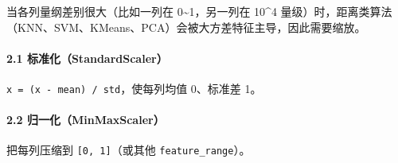 当各列量纲差别很大（比如一列在 0\textasciitilde1，另一列在 10\^{}4
量级）时，距离类算法（KNN、SVM、KMeans、PCA）会被大方差特征主导，因此需要缩放。

\paragraph{2.1
标准化（StandardScaler）}\label{ux6807ux51c6ux5316standardscaler}

\texttt{x\textquotesingle{}\ =\ (x\ -\ mean)\ /\ std}，使每列均值
0、标准差 1。

\begin{Shaded}
\begin{Highlighting}[]

\OperatorTok{=}\NormalTok{ np.array([[}\NormalTok{, }\NormalTok{], [}\NormalTok{, }\NormalTok{], [}\NormalTok{, }\NormalTok{]])}
\OperatorTok{=}
\NormalTok{(}\NormalTok{))}
\end{Highlighting}
\end{Shaded}

\begin{Shaded}
\begin{Highlighting}[]
\NormalTok{[[{-}1.2247 {-}1.2247]}
\NormalTok{ [ 0.      0.    ]}
\NormalTok{ [ 1.2247  1.2247]]}
\end{Highlighting}
\end{Shaded}

\paragraph{2.2
归一化（MinMaxScaler）}\label{ux5f52ux4e00ux5316minmaxscaler}

把每列压缩到 \texttt{{[}0,\ 1{]}}（或其他 \texttt{feature\_range}）。

\begin{Shaded}
\begin{Highlighting}[]

\OperatorTok{=}
\NormalTok{(}
\end{Highlighting}
\end{Shaded}

